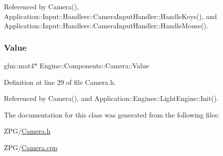 Referenced by Camera(), Application\+::\+Input\+::\+Handlers\+::\+Camera\+Input\+Handler\+::\+Handle\+Keys(), and Application\+::\+Input\+::\+Handlers\+::\+Camera\+Input\+Handler\+::\+Handle\+Mouse().

\mbox{\label{classEngine_1_1Components_1_1Camera_a5d131a78545d9f70496549946503b27a}} 
\subsubsection{\texorpdfstring{Value}{Value}}
{\footnotesize\ttfamily glm\+::mat4$\ast$ Engine\+::\+Components\+::\+Camera\+::\+Value}



Definition at line 29 of file Camera.\+h.



Referenced by Camera(), and Application\+::\+Engines\+::\+Light\+Engine\+::\+Init().



The documentation for this class was generated from the following files\+:\begin{DoxyCompactItemize}
\item 
Z\+P\+G/\mbox{\hyperlink{Camera_8h}{Camera.\+h}}\item 
Z\+P\+G/\mbox{\hyperlink{Camera_8cpp}{Camera.\+cpp}}\end{DoxyCompactItemize}
